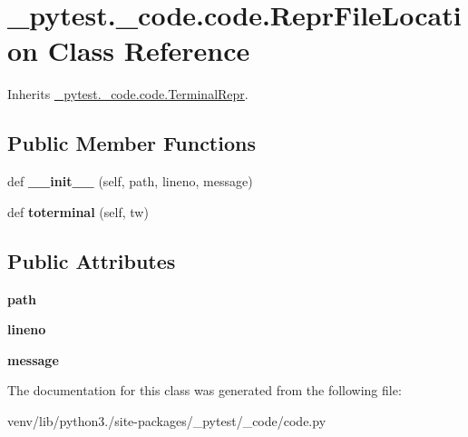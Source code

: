 \hypertarget{class__pytest_1_1__code_1_1code_1_1_repr_file_location}{}\section{\+\_\+pytest.\+\_\+code.\+code.\+Repr\+File\+Location Class Reference}
\label{class__pytest_1_1__code_1_1code_1_1_repr_file_location}


Inherits \hyperlink{class__pytest_1_1__code_1_1code_1_1_terminal_repr}{\+\_\+pytest.\+\_\+code.\+code.\+Terminal\+Repr}.

\subsection*{Public Member Functions}
\begin{DoxyCompactItemize}
\item 
\mbox{\label{class__pytest_1_1__code_1_1code_1_1_repr_file_location_abe8fe52055c9bdf70ec1c9deb03bf7c1}} 
def {\bfseries \+\_\+\+\_\+init\+\_\+\+\_\+} (self, path, lineno, message)
\item 
\mbox{\label{class__pytest_1_1__code_1_1code_1_1_repr_file_location_a6c079cc1e60eb046426e27e254b3da91}} 
def {\bfseries toterminal} (self, tw)
\end{DoxyCompactItemize}
\subsection*{Public Attributes}
\begin{DoxyCompactItemize}
\item 
\mbox{\label{class__pytest_1_1__code_1_1code_1_1_repr_file_location_a7311c9fbeb9869535f90b6f61938bece}} 
{\bfseries path}
\item 
\mbox{\label{class__pytest_1_1__code_1_1code_1_1_repr_file_location_a7abc878d53ae4f740bb8fa6730109f43}} 
{\bfseries lineno}
\item 
\mbox{\label{class__pytest_1_1__code_1_1code_1_1_repr_file_location_a3e5ef12ae50e552d8eb637cbce21a959}} 
{\bfseries message}
\end{DoxyCompactItemize}


The documentation for this class was generated from the following file\+:\begin{DoxyCompactItemize}
\item 
venv/lib/python3./site-\/packages/\+\_\+pytest/\+\_\+code/code.\+py\end{DoxyCompactItemize}
